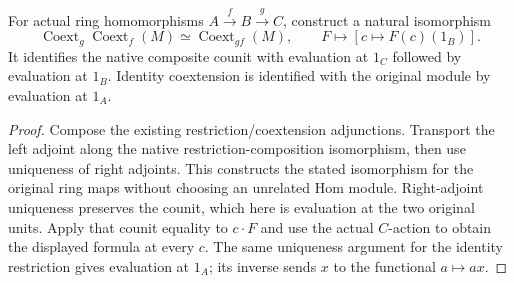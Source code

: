 \begin{lemma}
\label{lem:kn-nadel-coextension-composition}
\leanok
For actual ring homomorphisms $A\xrightarrow{f}B\xrightarrow{g}C$,
construct a natural isomorphism
\[
 \operatorname{Coext}_g\operatorname{Coext}_f(M)
 \simeq\operatorname{Coext}_{gf}(M),\qquad
 F\longmapsto[c\mapsto F(c)(1_B)].
\]
It identifies the native composite counit with evaluation at $1_C$
followed by evaluation at $1_B$.  Identity coextension is identified
with the original module by evaluation at $1_A$.
\end{lemma}
\begin{proof}
Compose the existing restriction/coextension adjunctions.  Transport
the left adjoint along the native restriction-composition
isomorphism, then use uniqueness of right adjoints.  This constructs
the stated isomorphism for the original ring maps without choosing
an unrelated Hom module.  Right-adjoint uniqueness preserves the
counit, which here is evaluation at the two original units.
Apply that counit equality to $c\cdot F$ and use the actual $C$-action
to obtain the displayed formula at every $c$.  The same uniqueness
argument for the identity restriction gives evaluation at $1_A$;
its inverse sends $x$ to the functional $a\mapsto ax$.
\end{proof}

